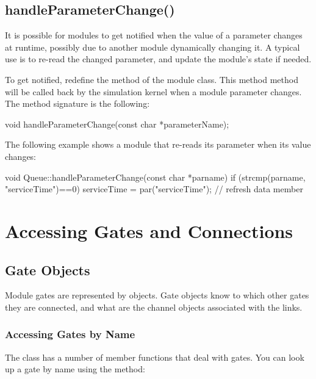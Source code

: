 \subsection{handleParameterChange()}
\label{sec:simple-modules:handleParameterChange}

It is possible for modules to get notified when the value of a
parameter changes at runtime, possibly due to another module
dynamically changing it. A typical use is to re-read the changed
parameter, and update the module's state if needed.

To get notified, redefine the  method
of the module class. This method method will be called back by the
simulation kernel when a module parameter changes. The method signature
is the following:

\begin{cpp}
void handleParameterChange(const char *parameterName);
\end{cpp}

The following example shows a module that re-reads
its  parameter when its value changes:

\begin{cpp}
void Queue::handleParameterChange(const char *parname)
{
    if (strcmp(parname, "serviceTime")==0)
        serviceTime = par("serviceTime"); // refresh data member
}
\end{cpp}


\section{Accessing Gates and Connections}
\label{sec:simple-modules:gates}

\subsection{Gate Objects}

Module gates are represented by  objects.
Gate objects know to which other gates they are connected, and
what are the channel objects associated with the links.

\subsubsection{Accessing Gates by Name}

The  class has a number of member functions that
deal with gates. You can look up a gate by name using the 
method:

